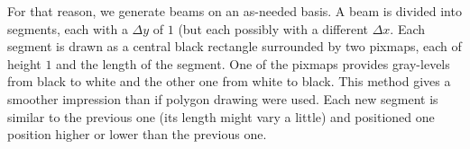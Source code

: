 For that reason, we generate beams on an as-needed basis.  A beam is
divided into segments, each with a $\Delta y$ of $1$ (but each
possibly with a different $\Delta x$.  Each segment is drawn as a
central black rectangle surrounded by two pixmaps, each of height $1$
and the length of the segment.  One of the pixmaps provides
gray-levels from black to white and the other one from white to
black.  This method gives a smoother impression than if polygon
drawing were used.  Each new segment is similar to the previous one
(its length might vary a little) and positioned one position higher or
lower than the previous one.
